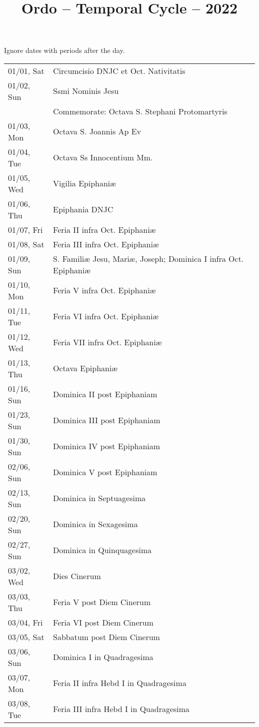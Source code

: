 \documentclass{article}
\title{Ordo -- Temporal Cycle -- 2022}
\begin{document}
\maketitle
{\centering Ignore dates with periods after the day.}
\begin{longtable}{ll}
01/01, Sat & Circumcisio DNJC et Oct. Nativitatis\\
01/02, Sun & Ssmi Nominis Jesu\\
 & Commemorate: Octava S. Stephani Protomartyris\\
01/03, Mon & Octava S. Joannis Ap Ev\\
01/04, Tue & Octava Ss Innocentium Mm.\\
01/05, Wed & Vigilia Epiphaniæ\\
01/06, Thu & Epiphania DNJC\\
01/07, Fri & Feria II infra Oct. Epiphaniæ\\
01/08, Sat & Feria III infra Oct. Epiphaniæ\\
01/09, Sun & S. Familiæ Jesu, Mariæ, Joseph; Dominica I infra Oct. Epiphaniæ\\
01/10, Mon & Feria V infra Oct. Epiphaniæ\\
01/11, Tue & Feria VI infra Oct. Epiphaniæ\\
01/12, Wed & Feria VII infra Oct. Epiphaniæ\\
01/13, Thu & Octava Epiphaniæ\\
01/16, Sun & Dominica II post Epiphaniam\\
01/23, Sun & Dominica III post Epiphaniam\\
01/30, Sun & Dominica IV post Epiphaniam\\
02/06, Sun & Dominica V post Epiphaniam\\
02/13, Sun & Dominica in Septuagesima\\
02/20, Sun & Dominica in Sexagesima\\
02/27, Sun & Dominica in Quinquagesima\\
03/02, Wed & Dies Cinerum\\
03/03, Thu & Feria V post Diem Cinerum\\
03/04, Fri & Feria VI post Diem Cinerum\\
03/05, Sat & Sabbatum post Diem Cinerum\\
03/06, Sun & Dominica I in Quadragesima\\
03/07, Mon & Feria II infra Hebd I in Quadragesima\\
03/08, Tue & Feria III infra Hebd I in Quadragesima\\

\end{longtable}
\end{document}
